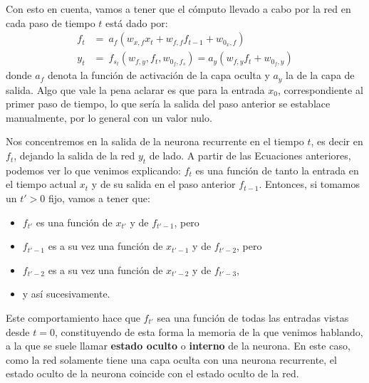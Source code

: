 \documentclass[../../main.tex]{subfiles}
\begin{document}
Con esto en cuenta, vamos a tener que el cómputo llevado a cabo por la red
en cada paso de tiempo \(t\) está dado por:
\begin{align}
    f_t &=\ a_f \left( w_{x,f} x_t  + w_{f,f} f_{t-1} + w_{0_x,f} \right) \label{eq:ft} \\
    y_t &=\ f_{s_t} \left( w_{f,y}, f_t, w_{0_f, f_s} \right) = a_y \left( w_{f,y} f_t + w_{0_f, y} \right) \label{eq:yt}
\end{align}
donde \(a_f\) denota la función de activación de la capa oculta y \(a_y\) la de la capa de
salida. Algo que vale la pena aclarar es que para la entrada \(x_0\), correspondiente al
primer paso de tiempo, lo que sería la salida del paso anterior se establace manualmente,
por lo general con un valor nulo.

Nos concentremos en la salida de la neurona recurrente en el tiempo \(t\), es decir
en \(f_t\), dejando la salida de la red \(y_t\) de lado. A partir de las Ecuaciones
anteriores, podemos ver lo que venimos explicando: \(f_t\) es una función de
tanto la entrada en el tiempo actual \(x_t\) y de su salida en el paso anterior
\(f_{t-1}\). Entonces, si tomamos un \(t' > 0\) fijo, vamos a tener que:
\begin{itemize}[itemsep=0.05cm]
    \item \(f_{t'}\) es una función de \(x_{t'}\) y de \(f_{t'-1}\), pero
    \item \(f_{t'-1}\) es a su vez una función de \(x_{t'-1}\) y de \(f_{t'-2}\), pero
    \item \(f_{t'-2}\) es a su vez una función de \(x_{t'-2}\) y de \(f_{t'-3}\),
    \item y así sucesivamente.
\end{itemize}
Este comportamiento hace que \(f_{t'}\) sea una función de todas las entradas vistas desde
\(t=0\), constituyendo de esta forma la memoria de la que venimos hablando, a la que se
suele llamar \textbf{estado oculto} o \textbf{interno} de la neurona. En este caso, como
la red solamente tiene una capa oculta con una neurona recurrente, el estado oculto de la
neurona coincide con el estado oculto de la red.
\end{document}
